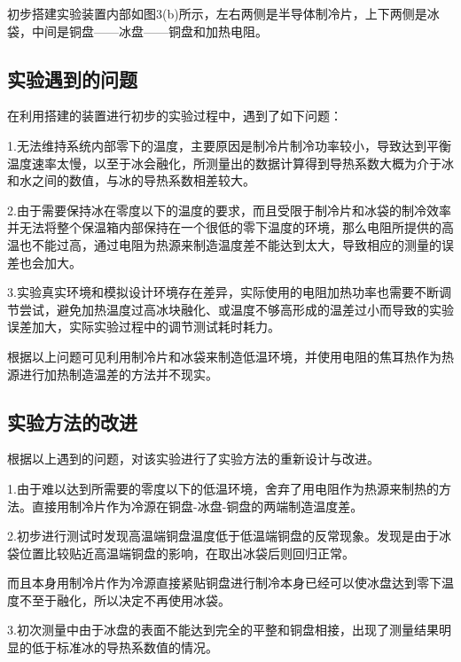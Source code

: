 \documentclass{article}
\begin{document}
初步搭建实验装置内部如图3(b)所示，左右两侧是半导体制冷片，上下两侧是冰袋，中间是铜盘——冰盘——铜盘和加热电阻。
\subsection{实验遇到的问题}
在利用搭建的装置进行初步的实验过程中，遇到了如下问题：


1.无法维持系统内部零下的温度，主要原因是制冷片制冷功率较小，导致达到平衡温度速率太慢，以至于冰会融化，所测量出的数据计算得到导热系数大概为介于冰和水之间的数值，与冰的导热系数相差较大。


2.由于需要保持冰在零度以下的温度的要求，而且受限于制冷片和冰袋的制冷效率并无法将整个保温箱内部保持在一个很低的零下温度的环境，那么电阻所提供的高温也不能过高，通过电阻为热源来制造温度差不能达到太大，导致相应的测量的误差也会加大。


3.实验真实环境和模拟设计环境存在差异，实际使用的电阻加热功率也需要不断调节尝试，避免加热温度过高冰块融化、或温度不够高形成的温差过小而导致的实验误差加大，实际实验过程中的调节测试耗时耗力。


根据以上问题可见利用制冷片和冰袋来制造低温环境，并使用电阻的焦耳热作为热源进行加热制造温差的方法并不现实。
\subsection{实验方法的改进}


根据以上遇到的问题，对该实验进行了实验方法的重新设计与改进。


  1.由于难以达到所需要的零度以下的低温环境，舍弃了用电阻作为热源来制热的方法。直接用制冷片作为冷源在铜盘-冰盘-铜盘的两端制造温度差。
     
     
2.初步进行测试时发现高温端铜盘温度低于低温端铜盘的反常现象。发现是由于冰袋位置比较贴近高温端铜盘的影响，在取出冰袋后则回归正常。
      
      
      而且本身用制冷片作为冷源直接紧贴铜盘进行制冷本身已经可以使冰盘达到零下温度不至于融化，所以决定不再使用冰袋。
      
      
3.初次测量中由于冰盘的表面不能达到完全的平整和铜盘相接，出现了测量结果明显的低于标准冰的导热系数值的情况。
       
\end{document}
